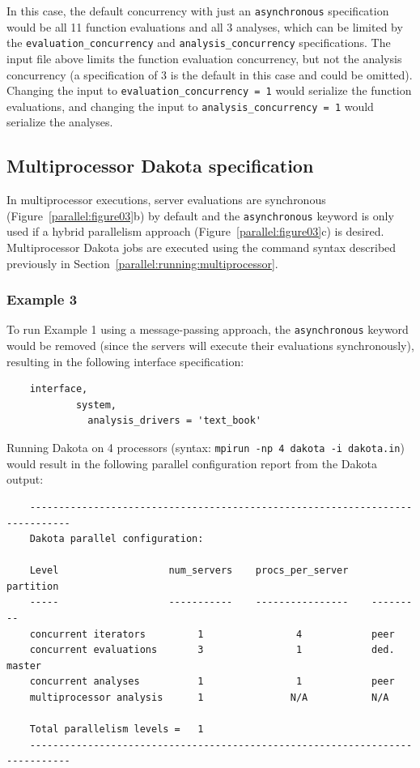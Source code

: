 In this case, the default concurrency with just an
\texttt{asynchronous} specification would be all 11 function
evaluations and all 3 analyses, which can be limited by the
\texttt{evaluation\_concurrency} and \texttt{analysis\_concurrency}
specifications. The input file above limits the function evaluation
concurrency, but not the analysis concurrency (a specification of 3 is
the default in this case and could be omitted). Changing the input to
\texttt{evaluation\_concurrency = 1} would serialize the function
evaluations, and changing the input to \texttt{analysis\_concurrency = 1}
would serialize the analyses.

\subsection{Multiprocessor Dakota specification}\label{parallel:spec:multi}

In multiprocessor executions, server evaluations are synchronous
(Figure~\ref{parallel:figure03}b) by default and the
\texttt{asynchronous} keyword is only used if a hybrid parallelism
approach (Figure~\ref{parallel:figure03}c) is desired. Multiprocessor
Dakota jobs are executed using the command syntax described previously
in Section~\ref{parallel:running:multiprocessor}.

\subsubsection{Example 3}\label{parallel:spec:multi:example3}

To run Example 1 using a message-passing approach, the
\texttt{asynchronous} keyword would be removed (since the servers will
execute their evaluations synchronously), resulting in the following
interface specification:
\begin{small}
\begin{verbatim}
    interface,
            system,
              analysis_drivers = 'text_book'
\end{verbatim}
\end{small}

Running Dakota on 4 processors (syntax: \texttt{mpirun -np 4 dakota -i
  dakota.in}) would result in the following parallel configuration
report from the Dakota output:
\begin{small}
\begin{verbatim}
    -----------------------------------------------------------------------------
    Dakota parallel configuration:

    Level                   num_servers    procs_per_server    partition
    -----                   -----------    ----------------    ---------
    concurrent iterators         1                4            peer
    concurrent evaluations       3                1            ded. master
    concurrent analyses          1                1            peer
    multiprocessor analysis      1               N/A           N/A

    Total parallelism levels =   1
    -----------------------------------------------------------------------------
\end{verbatim}
\end{small}


